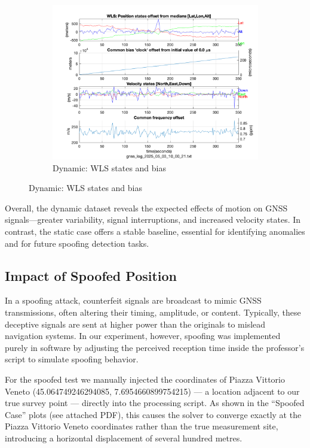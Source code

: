 \begin{figure}[h!]
\begin{subfigure}{0.23\textwidth}
                \includegraphics[width=\textwidth]{images/tests/Tram_15_trip_Castello_to_Pescatore/filtered/Samsung_A51_Tram_15_trip_Castello_to_Pescatore_fig5.png}
                \caption{Dynamic: WLS states and bias}
            \end{subfigure}
        \end{figure}
    
        \vspace{0.5em}
        \noindent Overall, the dynamic dataset reveals the expected effects of motion on GNSS signals—greater variability, signal interruptions, and increased velocity states. 
        In contrast, the static case offers a stable baseline, essential for identifying anomalies and for future spoofing detection tasks.

    \subsection{Impact of Spoofed Position}

        In a spoofing attack, counterfeit signals are broadcast to mimic GNSS transmissions, often altering their timing, amplitude, or content. 
        Typically, these deceptive signals are sent at higher power than the originals to mislead navigation systems. 
        In our experiment, however, spoofing was implemented purely in software by adjusting the perceived reception time inside the professor’s script to simulate spoofing behavior.
            
        \noindent For the spoofed test we manually injected the coordinates of Piazza Vittorio Veneto (45.064749246294085, 7.6954660899754215) — a location adjacent to our true survey point — directly into the processing script. 
        As shown in the “Spoofed Case” plots (see attached PDF), this causes the solver to converge exactly at the Piazza Vittorio Veneto coordinates rather than the true measurement site, introducing a horizontal displacement of several hundred metres.
        
